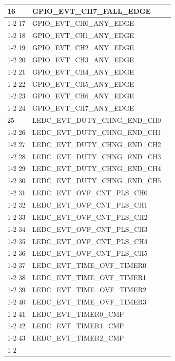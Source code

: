\documentclass[main\_\_EN.tex]{subfiles}
\begin{document}
\begin{longtable}{ | l | l | l | }
16  & GPIO\_EVT\_CH7\_FALL\_EDGE&  \\ \cline{1-2}
17  & GPIO\_EVT\_CH0\_ANY\_EDGE &  \\ \cline{1-2}
18  & GPIO\_EVT\_CH1\_ANY\_EDGE &  \\ \cline{1-2}
19  & GPIO\_EVT\_CH2\_ANY\_EDGE &  \\ \cline{1-2}
20  & GPIO\_EVT\_CH3\_ANY\_EDGE &  \\ \cline{1-2}
21  & GPIO\_EVT\_CH4\_ANY\_EDGE &  \\ \cline{1-2}
22  & GPIO\_EVT\_CH5\_ANY\_EDGE &  \\ \cline{1-2}
23  & GPIO\_EVT\_CH6\_ANY\_EDGE &  \\ \cline{1-2}
24  & GPIO\_EVT\_CH7\_ANY\_EDGE &  \\ \hline
25  & LEDC\_EVT\_DUTY\_CHNG\_END\_CH0  & \nameref{mod:ledpwm}\\ \cline{1-2}
26  & LEDC\_EVT\_DUTY\_CHNG\_END\_CH1  & \\ \cline{1-2}
27  & LEDC\_EVT\_DUTY\_CHNG\_END\_CH2  & \\ \cline{1-2}
28  & LEDC\_EVT\_DUTY\_CHNG\_END\_CH3  & \\ \cline{1-2}
29  & LEDC\_EVT\_DUTY\_CHNG\_END\_CH4  & \\ \cline{1-2}
30  & LEDC\_EVT\_DUTY\_CHNG\_END\_CH5  & \\ \cline{1-2}
31  & LEDC\_EVT\_OVF\_CNT\_PLS\_CH0    & \\ \cline{1-2}
32  & LEDC\_EVT\_OVF\_CNT\_PLS\_CH1    & \\ \cline{1-2}
33  & LEDC\_EVT\_OVF\_CNT\_PLS\_CH2    & \\ \cline{1-2}
34  & LEDC\_EVT\_OVF\_CNT\_PLS\_CH3    & \\ \cline{1-2}
35  & LEDC\_EVT\_OVF\_CNT\_PLS\_CH4    & \\ \cline{1-2}
36  & LEDC\_EVT\_OVF\_CNT\_PLS\_CH5    & \\ \cline{1-2}
37  & LEDC\_EVT\_TIME\_OVF\_TIMER0     & \\ \cline{1-2}
38  & LEDC\_EVT\_TIME\_OVF\_TIMER1     & \\ \cline{1-2}
39  & LEDC\_EVT\_TIME\_OVF\_TIMER2     & \\ \cline{1-2}
40  & LEDC\_EVT\_TIME\_OVF\_TIMER3     & \\ \cline{1-2}
41  & LEDC\_EVT\_TIMER0\_CMP    & \\ \cline{1-2}
42  & LEDC\_EVT\_TIMER1\_CMP    & \\ \cline{1-2}
43  & LEDC\_EVT\_TIMER2\_CMP    & \\ \cline{1-2}

\end{longtable}
\end{document}
